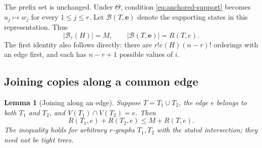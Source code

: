 \documentclass[11pt]{article}
\numberwithin{equation}{section}
\newtheorem{lemma}[theorem]{Lemma}
\theoremstyle{definition}
\begin{document}
The prefix set is unchanged.  Under $\Theta$, condition
\eqref{eq:anchored-support} becomes $u_j\mapsto w_j$ for every
$1\leq j\leq r$.  Let $\mathcal B(T,\mathbf e)$ denote the supporting
states in this representation.  Thus
\begin{equation}
 |\mathcal B_r(H)|=M,\qquad
 |\mathcal B(T,\mathbf e)|=R(T,e).
 \label{eq:front-counts}
\end{equation}
The first identity also follows directly:
there are $r!e(H)(n-r)!$ orderings with an edge first, and each has
$n-r+1$ possible values of $i$.

\subsection{Joining copies along a common edge}

\begin{lemma}[Joining along an edge]
\label{lem:anchored-glue}
Suppose $T=T_1\cup T_2$, the edge $e$ belongs to both $T_1$ and $T_2$,
and $V(T_1)\cap V(T_2)=e$.  Then
\begin{equation}
 R(T_1,e)+R(T_2,e)\leq M+R(T,e).
 \label{eq:anchored-glue}
\end{equation}
The inequality holds for arbitrary $r$-graphs $T_1,T_2$ with the stated
intersection; they need not be tight trees.
\end{lemma}
\end{document}
